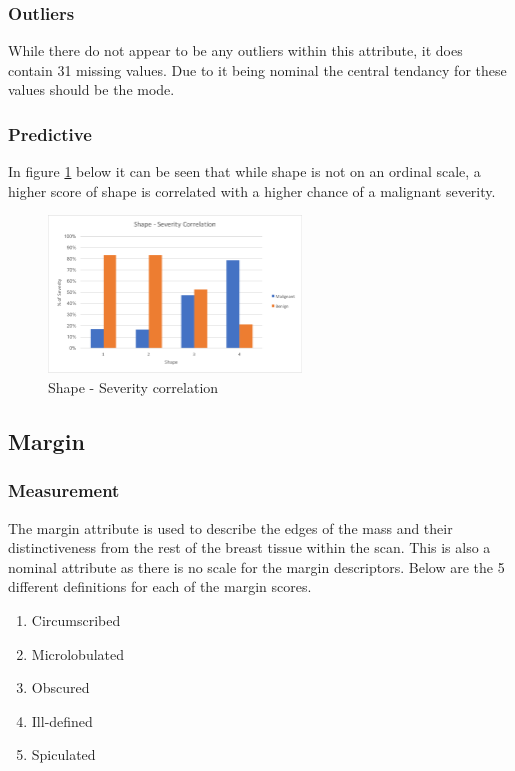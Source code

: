 \documentclass[12pt]{article}
\begin{document}
      \subsubsection{Outliers}
        While there do not appear to be any outliers within this attribute, it does contain 31 missing values. Due to it being nominal the central tendancy for these values should be the mode.

      \subsubsection{Predictive}
        In figure \ref{fig:shape-severity-correlation} below it can be seen that while shape is not on an ordinal scale, a higher score of shape is correlated with a higher chance of a malignant severity.

        \begin{figure}[H]
          \centering
          \includegraphics[width=0.6\textwidth]{shape-severity-correlation}
          \caption{Shape - Severity correlation}
          \label{fig:shape-severity-correlation}
        \end{figure}

    \subsection{Margin}
      \subsubsection{Measurement}
        The margin attribute is used to describe the edges of the mass and their distinctiveness from the rest of the breast tissue within the scan. This is also a nominal attribute as there is no scale for the margin descriptors. Below are the 5 different definitions for each of the margin scores.

        \singlespacing
        \begin{enumerate}[label=\arabic*)]
          \item Circumscribed
          \item Microlobulated
          \item Obscured
          \item Ill-defined
          \item Spiculated
        \end{enumerate}
        \doublespacing
\end{document}
